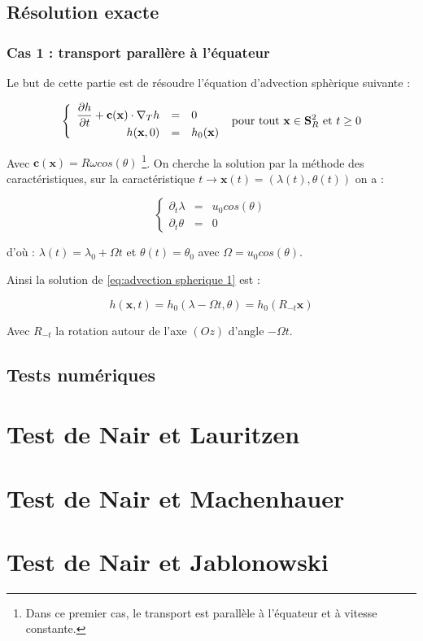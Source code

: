 \subsection{Résolution exacte}

\subsubsection{Cas 1 : transport parallère à l'équateur}

Le but de cette partie est de résoudre l'équation d'advection sphèrique suivante :

\begin{equation}
\label{eq:advection spherique 1}
\left\lbrace
\begin{array}{r cl}
\dfrac{\partial h}{\partial t} + \mathbf{c} ( \mathbf{x} ) \cdot \nabla_ T h & = & 0 \\
h(\mathbf{x},0) & = & h_0 ( \mathbf{x} )
\end{array}
\right. \text{ pour tout } \mathbf{x} \in \mathbf{S}_R^2 \text{ et } t \geq 0
\end{equation}

Avec $\mathbf{c} ( \mathbf{x} ) = R \omega cos ( \theta )$ \footnote{Dans ce premier cas, le transport est parallèle à l'équateur et à vitesse constante.}.
On cherche la solution par la méthode des caractéristiques, sur la caractéristique $t \rightarrow\mathbf{x}(t) = (\lambda (t), \theta(t) )$ on a :

\begin{equation}
\left\lbrace
\begin{array}{rcl}
\partial_t \lambda & = & u_0 cos ( \theta ) \\
\partial_t \theta & = & 0
\end{array}
\right.
\end{equation}

d'où : $\lambda(t) = \lambda_0 + \Omega t$ et $\theta(t) = \theta_0$ avec $\Omega = u_0 cos ( \theta )$.

Ainsi la solution de \eqref{eq:advection spherique 1} est :

\begin{equation}
h( \mathbf{x}, t ) = h_0 ( \lambda - \Omega t, \theta ) = h_0 ( R_{-t}  \mathbf{x} )
\end{equation}

Avec $R_{-t}$ la rotation autour de l'axe $(Oz)$ d'angle $-\Omega t$.


\subsection{Tests numériques}

\section{Test de Nair et Lauritzen}

\section{Test de Nair et Machenhauer}

\section{Test de Nair et Jablonowski}